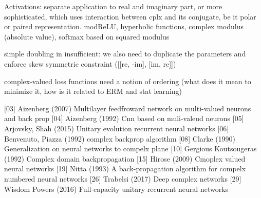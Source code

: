 Activations: separate application to real and imaginary part, or more sophisticated, which uses
interaction between cplx and its conjugate, be it polar or paired representation. modReLU, hyperbolic
functions, complex modulus (absolute value), softmax based on squared modulus

simple doubling in insufficient: we also need to duplicate the parameters and enforce skew symmetric
constraint ([[re, -im], [im, re]])

complex-valued loss functions need a notion of ordering (what does it mean to minimize it,
how is it related to ERM and stat learning)


[03] Aizenberg (2007) Multilayer feedfroward network on multi-valued neurons and back prop
[04] Aizenberg (1992) Cnn based on muli-valeud neurons 
[05] Arjovsky, Shah (2015) Unitary evolution recurrent neural networks
[06] Benvenuto, Piazza (1992) complex backprop algorithm
[08] Clarke (1990) Generalization on neural networks to compelx plane
[10] Gergious Koutsougeras (1992) Complex domain backpropagation
[15] Hirose (2009) Cmoplex valued neural networks
[19] Nitta (1993) A back-propagation algorithm for compelx numbered neural networks
[26] Trabelsi (2017) Deep complex networks
[29] Wisdom Powers (2016) Full-capacity unitary recurrent neural networks
